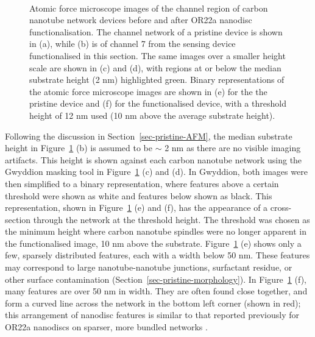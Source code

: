 \documentclass[
  a4paper,
]{scrbook}
\begin{document}
\begin{figure}
\begin{minipage}[t]{0.01\linewidth}
{\centering 

~

}

\end{minipage}%

\caption[Atomic force microscope images of the channel region of carbon
nanotube network devices before and after successful OR22a nanodisc
functionalisation, with substrate and nanodisc heights indicated using
masking and binary representations.]{\label{fig-working-OR22a-AFM}Atomic
force microscope images of the channel region of carbon nanotube network
devices before and after OR22a nanodisc functionalisation. The channel
network of a pristine device is shown in (a), while (b) is of channel 7
from the sensing device functionalised in this section. The same images
over a smaller height scale are shown in (c) and (d), with regions at or
below the median substrate height (2 nm) highlighted green. Binary
representations of the atomic force microscope images are shown in (e)
for the the pristine device and (f) for the functionalised device, with
a threshold height of 12 nm used (10 nm above the average substrate
height).}

\end{figure}

Following the discussion in Section~\ref{sec-pristine-AFM}, the median
substrate height in Figure~\ref{fig-working-OR22a-AFM} (b) is assumed to
be \(\sim\) 2 nm as there are no visible imaging artifacts. This height
is shown against each carbon nanotube network using the Gwyddion masking
tool in Figure~\ref{fig-working-OR22a-AFM} (c) and (d). In Gwyddion,
both images were then simplified to a binary representation, where
features above a certain threshold were shown as white and features
below shown as black. This representation, shown in
Figure~\ref{fig-working-OR22a-AFM} (e) and (f), has the appearance of a
cross-section through the network at the threshold height. The threshold
was chosen as the minimum height where carbon nanotube spindles were no
longer apparent in the functionalised image, 10 nm above the substrate.
Figure~\ref{fig-working-OR22a-AFM} (e) shows only a few, sparsely
distributed features, each with a width below 50 nm. These features may
correspond to large nanotube-nanotube junctions, surfactant residue, or
other surface contamination (Section~\ref{sec-pristine-morphology}). In
Figure~\ref{fig-working-OR22a-AFM} (f), many features are over 50 nm in
width. They are often found close together, and form a curved line
across the network in the bottom left corner (shown in red); this
arrangement of nanodisc features is similar to that reported previously
for OR22a nanodiscs on sparser, more bundled networks
\autocite{Murugathas2019a}.
\end{document}
